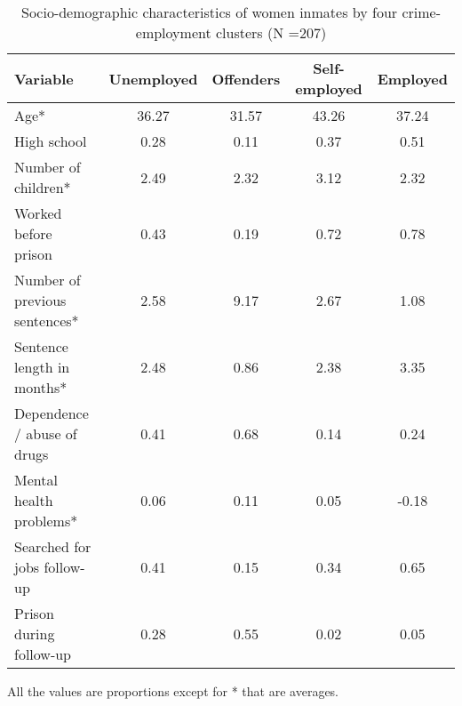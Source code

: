 \begin{table}[htp]
\footnotesize
\setlength{\tabcolsep}{10pt}
\renewcommand{\arraystretch}{1.3}
\begin{threeparttable}
\centering
\caption{Socio-demographic characteristics of women inmates \newline by four crime-employment clusters (N =207)} 
\label{tab:descriptives_job_crime_4}
\begin{tabular}{lcccc}
  \hline
Variable & Unemployed & Offenders & Self-employed & Employed \\ 
  \hline
Age* & 36.27 & 31.57 & 43.26 & 37.24 \\ 
  High school & 0.28 & 0.11 & 0.37 & 0.51 \\ 
  Number of children* & 2.49 & 2.32 & 3.12 & 2.32 \\ 
  Worked before prison & 0.43 & 0.19 & 0.72 & 0.78 \\ 
  Number of previous sentences* & 2.58 & 9.17 & 2.67 & 1.08 \\ 
  Sentence length in months* & 2.48 & 0.86 & 2.38 & 3.35 \\ 
  Dependence / abuse of drugs & 0.41 & 0.68 & 0.14 & 0.24 \\ 
  Mental health problems* & 0.06 & 0.11 & 0.05 & -0.18 \\ 
  Searched for jobs follow-up & 0.41 & 0.15 & 0.34 & 0.65 \\ 
  Prison during follow-up & 0.28 & 0.55 & 0.02 & 0.05 \\ 
   \hline
\end{tabular}
\begin{tablenotes}
\scriptsize
\item All the values are proportions except for * that are averages.
\end{tablenotes}
\end{threeparttable}
\end{table}
